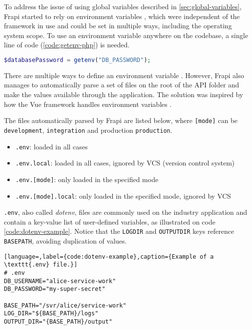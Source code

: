 To address the issue of using global variables described in \autoref{sec:global-variables}, Frapi started to rely on environment variables \cite{frapi-environment-variables}, which were independent of the framework in use and could be set in multiple ways, including the operating system scope. To use an environment variable anywhere on the codebase, a single line of code (\autoref{code:getenv-php}) is needed.

\begin{lstlisting}[language=PHP,label={code:getenv-php},caption={Example of retrienving an environment variable on PHP.}]
$databasePassword = getenv("DB_PASSWORD");
\end{lstlisting}

There are multiple ways to define an environment variable \cite{defining-environment-variables}. However, Frapi also manages to automatically parse a set of files on the root of the API folder and make the values available through the application. The solution was inspired by how the Vue framework \cite{vue-about} handles environment variables \cite{vue-environment-variables}.

The files automatically parsed by Frapi are listed below, where \texttt{[mode]} can be \texttt{development}, \texttt{integration} and production \texttt{production}.

\begin{itemize}
    \item \texttt{.env}: loaded in all cases
    \item \texttt{.env.local}: loaded in all cases, ignored by VCS (version control system)
    \item \texttt{.env.[mode]}: only loaded in the specified mode
    \item \texttt{.env.[mode].local}: only loaded in the specified mode, ignored by VCS
\end{itemize}

\texttt{.env}, also called \textit{dotenv}, files are commonly used on the industry application and contain a key-value list of user-defined variables, as illustrated on code \autoref{code:dotenv-example}. Notice that the \texttt{LOG\textunderscore DIR} and \texttt{OUTPUT\textunderscore DIR} keys reference \texttt{BASE\textunderscore PATH}, avoiding duplication of values.

\begin{lstlisting}[language=,label={code:dotenv-example},caption={Example of a \texttt{.env} file.}]
# .env
DB_USERNAME="alice-service-work"
DB_PASSWORD="my-super-secret"

BASE_PATH="/svr/alice/service-work"
LOG_DIR="${BASE_PATH}/logs"
OUTPUT_DIR="{BASE_PATH}/output"
\end{lstlisting}

